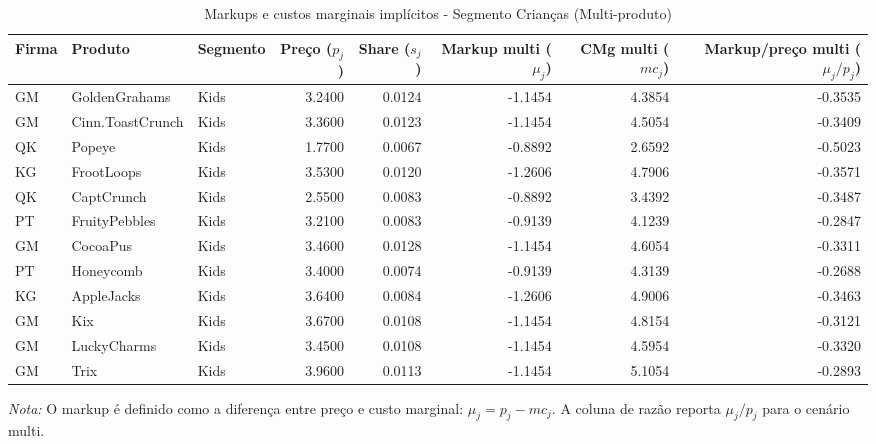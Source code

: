 \begingroup
\begin{table}[H]
\centering
\caption{Markups e custos marginais implícitos - Segmento Crianças (Multi-produto)}
\label{tab:markups-kids-multi}
\scriptsize
\setlength{\tabcolsep}{3pt}
\renewcommand{\arraystretch}{1.05}
\begin{tabular}{@{}llp{}rrrrr@{}}
\toprule
Firma & Produto & Segmento & Preço ($p_j$) & Share ($s_j$) & Markup multi ($\mu_j$) & CMg multi ($mc_j$) & Markup/preço multi ($\mu_j/p_j$) \\
\midrule
GM & GoldenGrahams & Kids & 3.2400 & 0.0124 & -1.1454 & 4.3854 & -0.3535 \\
GM & Cinn.ToastCrunch & Kids & 3.3600 & 0.0123 & -1.1454 & 4.5054 & -0.3409 \\
QK & Popeye & Kids & 1.7700 & 0.0067 & -0.8892 & 2.6592 & -0.5023 \\
KG & FrootLoops & Kids & 3.5300 & 0.0120 & -1.2606 & 4.7906 & -0.3571 \\
QK & CaptCrunch & Kids & 2.5500 & 0.0083 & -0.8892 & 3.4392 & -0.3487 \\
PT & FruityPebbles & Kids & 3.2100 & 0.0083 & -0.9139 & 4.1239 & -0.2847 \\
GM & CocoaPus & Kids & 3.4600 & 0.0128 & -1.1454 & 4.6054 & -0.3311 \\
PT & Honeycomb & Kids & 3.4000 & 0.0074 & -0.9139 & 4.3139 & -0.2688 \\
KG & AppleJacks & Kids & 3.6400 & 0.0084 & -1.2606 & 4.9006 & -0.3463 \\
GM & Kix & Kids & 3.6700 & 0.0108 & -1.1454 & 4.8154 & -0.3121 \\
GM & LuckyCharms & Kids & 3.4500 & 0.0108 & -1.1454 & 4.5954 & -0.3320 \\
GM & Trix & Kids & 3.9600 & 0.0113 & -1.1454 & 5.1054 & -0.2893 \\
\bottomrule
\end{tabular}

\vspace{0.3em}
\scriptsize
\textit{Nota:} O markup é definido como a diferença entre preço e custo marginal: $\mu_j=p_j-mc_j$. A coluna de razão reporta $\mu_j/p_j$ para o cenário multi.
\end{table}
\endgroup

